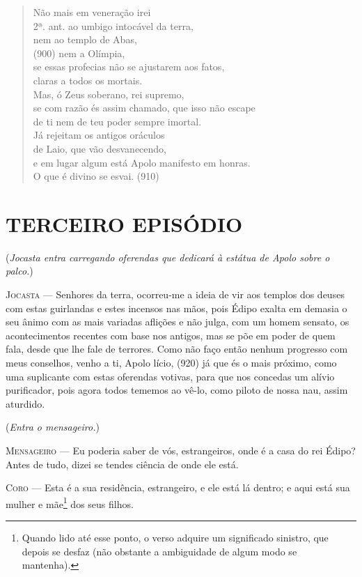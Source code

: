 \begin{verse}
Não mais em veneração irei\\ 2ª. ant.
ao umbigo intocável da terra,\\
nem ao templo de Abas,\\ (900)
nem a Olímpia,\\
se essas profecias não se ajustarem aos fatos,\\
claras a todos os mortais.\\
Mas, ó Zeus soberano, rei supremo,\\
se com razão és assim chamado, que isso não escape\\
de ti nem de teu poder sempre imortal.\\
Já rejeitam os antigos oráculos\\
de Laio, que vão desvanecendo,\\
e em lugar algum está Apolo manifesto em honras.\\
O que é divino se esvai. (910)
\end{verse}

\section{TERCEIRO EPISÓDIO}

(\emph{Jocasta entra carregando oferendas que dedicará à estátua de
Apolo sobre o palco.})

\textsc{Jocasta} --- Senhores da terra, ocorreu-me a ideia de vir aos templos dos deuses com
estas guirlandas e estes incensos nas mãos, pois Édipo exalta em demasia
o seu ânimo com as mais variadas aflições e não julga, com um homem
sensato, os acontecimentos recentes com base nos antigos, mas se põe em
poder de quem fala, desde que lhe fale de terrores. Como não faço então
nenhum progresso com meus conselhos, venho a ti, Apolo lício, (920) já
que és o mais próximo, como uma suplicante com estas oferendas votivas,
para que nos concedas um alívio purificador, pois agora todos tememos ao
vê-lo, como piloto de nossa nau, assim aturdido.

(\emph{Entra o mensageiro.})

\textsc{Mensageiro} --- Eu poderia saber de vós, estrangeiros, onde é a casa do rei Édipo? Antes
de tudo, dizei se tendes ciência de onde ele está.

\textsc{Coro} --- Esta é a sua residência, estrangeiro, e ele está lá dentro; e aqui está
sua mulher e mãe\footnote{Quando lido até esse ponto, o verso adquire um
  significado sinistro, que depois se desfaz (não obstante a ambiguidade
  de algum modo se mantenha).} dos seus filhos.

